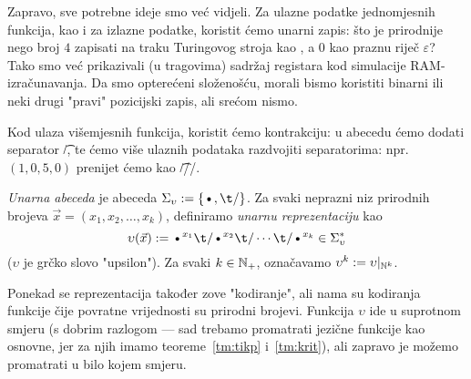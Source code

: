 Zapravo, sve potrebne ideje smo već vidjeli. Za ulazne podatke jednomjesnih funkcija, kao i za izlazne podatke, koristit ćemo unarni zapis: što je prirodnije nego broj $4$ zapisati na traku Turingovog stroja kao \textbullet\textbullet\textbullet\textbullet, a $0$ kao praznu riječ $\varepsilon$\@? Tako smo već prikazivali (u tragovima) sadržaj registara kod simulacije RAM-izračunavanja. Da smo opterećeni složenošću, morali bismo koristiti binarni ili neki drugi "pravi" pozicijski zapis, ali srećom nismo.

Kod ulaza višemjesnih funkcija, koristit ćemo kontrakciju: u abecedu ćemo dodati separator \t/, te ćemo više ulaznih podataka razdvojiti separatorima: npr.\ $(1,0,5,0)$ prenijet ćemo kao \t{\textbullet//\textbullet\textbullet\textbullet\textbullet\textbullet/}.

\begin{definicija}\label{def:upsilon}
\emph{Unarna abeceda} je abeceda $\Sigma_\upsilon:=\{\text\textbullet,\t/\}$. Za svaki neprazni niz prirodnih brojeva $\vec x=(x_1,x_2,\dotsc,x_k)$, definiramo \emph{unarnu reprezentaciju} kao
\begin{equation}\label{eq:upsilondef}
    \upsilon(\vec x):=\text\textbullet^{x_1}\t/\text\textbullet^{x_2}\t/\dotsm\t/\text\textbullet^{x_k}\in\Sigma_\upsilon^*
\end{equation}
($\upsilon$ je grčko slovo "upsilon"). Za svaki $k\in{\mathbb N}_+$, označavamo $\upsilon^k:=\upsilon|_{{\mathbb N}^k}$.
\end{definicija}

Ponekad se reprezentacija također zove "kodiranje", ali nama su kodiranja funkcije čije povratne vrijednosti su prirodni brojevi. Funkcija $\upsilon$ ide u suprotnom smjeru (s dobrim razlogom --- sad trebamo promatrati jezične funkcije kao osnovne, jer za njih imamo teoreme~\ref{tm:tikp} i~\ref{tm:krit}), ali zapravo je možemo promatrati u bilo kojem smjeru.

